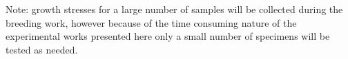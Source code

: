 Note: growth stresses for a large number of samples will be collected during
the breeding work, however because of the time consuming nature of the
experimental works presented here only a small number of specimens will be
tested as needed.